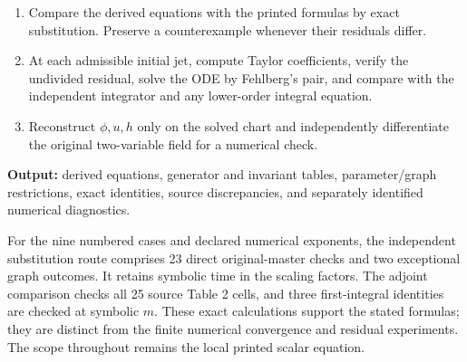 \begin{minipage}{\linewidth}
\begin{algorithm}
\begin{enumerate}
\item Compare the derived equations with the printed formulas by exact
      substitution. Preserve a counterexample whenever their residuals differ.
\item At each admissible initial jet, compute Taylor coefficients, verify
      the undivided residual, solve the ODE by Fehlberg's pair, and compare
      with the independent integrator and any lower-order integral equation.
\item Reconstruct $\phi,u,h$ only on the solved chart and independently
      differentiate the original two-variable field for a numerical check.
\end{enumerate}
\textbf{Output:} derived equations, generator and invariant tables,
parameter/graph restrictions, exact identities, source discrepancies,
and separately identified numerical diagnostics.
\end{algorithm}
\end{minipage}\par

For the nine numbered cases and declared numerical exponents, the
independent substitution route comprises 23 direct original-master checks
and two exceptional graph outcomes. It retains symbolic time in the
scaling factors. The adjoint comparison checks all 25 source Table 2
cells, and three first-integral identities are checked at symbolic $m$.
These exact calculations support the stated formulas; they are distinct
from the finite numerical convergence and residual experiments.
The scope throughout remains the local printed scalar equation.
